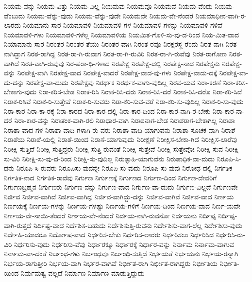 {ನಿಯಮ-ವನ್ನು
ನಿಯಮ-ವಿತ್ತು
ನಿಯಮ-ವಿಲ್ಲ
ನಿಯಮವು
ನಿಯಮವೂ
ನಿಯಮವೆ
ನಿಯಮ-ವೆಂದು
ನಿಯಮ-ವೆಂಬುದು
ನಿಯಮ-ವೆನ್ನು-ವುದು
ನಿಯಮ-ವೆನ್ನು-ವುದೇ
ನಿಯಮವೇ
ನಿಯಮ-ವೇ-ನೆಂದರೆ
ನಿಯಮಾಧೀನ-ವಾಗಿ-ರ-ಲಾರದು
ನಿಯಮಾನು-ಸಾರ
ನಿಯಮಾವಳಿ
ನಿಯಮಾವಳಿ-ಗಳ
ನಿಯಮಾವಳಿ-ಗಳನ್ನು
ನಿಯಮಾವಳಿ-ಗಳಿವೆ
ನಿಯಮಾವಳಿ-ಗಳು
ನಿಯಮಾವಳಿ-ಗಳೆಲ್ಲ
ನಿಯಮಾವಳಿಯ
ನಿಯಮಿತ-ಗೊಳಿ-ಸು-ವು-ದ-ರಿಂದ
ನಿಯ-ಮಿತ-ವಾದ
ನಿಯಾಮಾನು-ಸಾರ
ನಿರಂತರ
ನಿರಂತರ-ತೆಯು
ನಿರಂತರ-ವಾಗಿ
ನಿರಂತ-ರವೂ
ನಿರಕ್ಷರಸ್ಥ-ರೆಂದು
ನಿರತ-ನಾಗಿ
ನಿರತ-ನಾಗಿದ್ದಾಗ
ನಿರತ-ರಾಗಿದ್ದ
ನಿರತ-ರಾ-ಗಿ-ರುವಾಗ
ನಿರತ-ರಾ-ಗಿ-ರುವಿರಿ
ನಿರತ-ರಾ-ಗಿ-ರುವೆವು
ನಿರತ-ರಾಗೋಣ
ನಿರತ-ವಾಗಿದೆ
ನಿರತ-ವಾಗಿ-ರುವುವು
ನಿರ-ಪರಾ-ಧಿ-ಗಳಾದ
ನಿರಪೇಕ್ಷ
ನಿರಪೇಕ್ಷ-ದಲ್ಲಿ
ನಿರಪೇಕ್ಷ-ನಾದ
ನಿರಪೇಕ್ಷನು
ನಿರಪೇಕ್ಷ-ವನ್ನು
ನಿರಪೇಕ್ಷ-ವಾಗಿ
ನಿರಪೇಕ್ಷ-ವಾದ
ನಿರಪೇಕ್ಷ-ವಾದರೆ
ನಿರಪೇಕ್ಷ-ವಾದ-ವು-ಗಳು
ನಿರಪೇಕ್ಷ-ವಾದು-ದಕ್ಕೆ
ನಿರಪೇಕ್ಷ-ವಾ-ದು-ದನ್ನು
ನಿರಪೇಕ್ಷ-ವಾ-ದುದು
ನಿರಪೇಕ್ಷವು
ನಿರರ್ಥಕ
ನಿರರ್ಥಕ-ವಾಗು-ವುದಿಲ್ಲ
ನಿರವ-ಯವ
ನಿರಾ-ಕರಣೆ
ನಿರಾ-ಕರಿಸ-ಬೇಕಾಗು-ವುದು
ನಿರಾ-ಕರಿಸ-ಬೇಡ
ನಿರಾಕ-ರಿಸಿ
ನಿರಾಕ-ರಿಸಿ-ದರು
ನಿರಾಕ-ರಿಸಿ-ದರೆ
ನಿರಾಕ-ರಿಸಿ-ದರೊ
ನಿರಾ-ಕರಿ-ಸಿದೆ
ನಿರಾಕ-ರಿಸಿವೆ
ನಿರಾಕ-ರಿ-ಸುತ್ತೇವೆ
ನಿರಾಕ-ರಿ-ಸುವರು
ನಿರಾ-ಕರಿ-ಸುವ-ವರೆ
ನಿರಾ-ಕರಿ-ಸು-ವುದಿಲ್ಲ
ನಿರಾಕ-ರಿ-ಸು-ವುದು
ನಿರಾ-ಕಾರ
ನಿರಾ-ಕಾ-ರಕ್ಕೆ
ನಿರಾ-ಕಾರದ
ನಿರಾ-ಕಾರ-ದಲ್ಲಿ
ನಿರಾ-ಕಾರ-ದಿಂದ
ನಿರಾ-ಕಾರ-ನಾಗಿ-ರ-ಬೇಕು
ನಿರಾ-ಕಾರ-ನಾ-ದರೆ
ನಿರಾ-ಕಾರ-ವನ್ನು
ನಿರಾತಂಕ-ವಾಗಿ-ರಲಿ
ನಿರಾಧಾರ-ವಾಗಿ
ನಿರಾಶನಾಗ-ಬೇಡ
ನಿರಾಶರಾಗ-ಬೇಕಾಗಿಲ್ಲ
ನಿರಾಶಾ
ನಿರಾಶಾ-ವಾದ-ಗಳ
ನಿರಾಶಾ-ವಾದಿ-ಗಳಾಗಿ-ರು-ವರು
ನಿರಾಶಾ-ವಾದಿ-ಯಾಗುವನು
ನಿರಾಶಾ-ಸೂಚಕ-ವಾಗಿ
ನಿರಾಶೆ
ನಿರಾಶೆಯ
ನಿರಾಶೆ-ಯಲ್ಲಿ
ನಿರಾಶೆ-ಯಿಂದ
ನಿರಾಸೆ-ಯಾಗುವುದು
ನಿರೀಕ್ಷಣೆ
ನಿರೀಕ್ಷಿಸ-ಬೇಕಾ-ಗಿದೆ
ನಿರೀಕ್ಷಿಸ-ಲಾರೆವು
ನಿರೀಕ್ಷಿ-ಸುತ್ತಿದೆ
ನಿರೀಕ್ಷಿ-ಸುತ್ತಿದ್ದರು
ನಿರೀಕ್ಷಿ-ಸುತ್ತಿ-ರುವಂತೆ
ನಿರೀಕ್ಷಿ-ಸುತ್ತೇವೆ
ನಿರೀಕ್ಷಿ-ಸುತ್ತೇವೋ
ನಿರೀಕ್ಷಿ-ಸುವ
ನಿರೀಕ್ಷಿ-ಸು-ವಿರಿ
ನಿರೀಕ್ಷಿ-ಸು-ವು-ದ-ರಿಂದ
ನಿರೀಕ್ಷಿ-ಸು-ವುದಿಲ್ಲ
ನಿರುತ್ಸಾಹಿ-ಯಾಗುವೆನು
ನಿರುಪಾಧಿಕ-ವಾ-ದುದು
ನಿರೂಪಿ-ಸಿ-ದನು
ನಿರೂಪಿ-ಸಿ-ರುವರು
ನಿರೂಪಿಸು-ವುದನ್ನೇ
ನಿರೂಪಿ-ಸು-ವುದು
ನಿರೂಪಿ-ಸು-ವುವು
ನಿರೋಧ-ದಲ್ಲಿ
ನಿರ್ಗತಿಕ
ನಿರ್ಗತಿಕ-ನಾದ
ನಿರ್ಗತಿಕ-ರಾದೆವು
ನಿರ್ಗುಣ
ನಿರ್ಗುಣಕ್ಕೆ
ನಿರ್ಗುಣದ
ನಿರ್ಗುಣ-ದಿಂದ
ನಿರ್ಗುಣ-ದೇವರಿಗೆ
ನಿರ್ಗುಣಬ್ರಹ್ಮನ
ನಿರ್ಗುಣರು
ನಿರ್ಗುಣ-ವನ್ನು
ನಿರ್ಗುಣ-ವಾದ
ನಿರ್ಗುಣ-ವಾ-ದುದು
ನಿರ್ಗುಣ-ವಿಲ್ಲದೆ
ನಿರ್ಗುಣವೇ
ನಿರ್ಜಿವ
ನಿರ್ಜಿವ-ವಾಗಿದೆ
ನಿರ್ಜಿವ-ವಾಗಿದ್ದ
ನಿರ್ಜಿವ-ವಾಗಿದ್ದು-ದನ್ನು
ನಿರ್ಜಿವ-ವಾಗಿವೆ
ನಿರ್ಜಿವ-ವಾದ
ನಿರ್ಣಯ
ನಿರ್ಣಯಕ್ಕೆ
ನಿರ್ಣಯ-ಗಳನ್ನು
ನಿರ್ಣಯ-ಗಳಷ್ಟು
ನಿರ್ಣಯ-ಗಳಿಗೆ
ನಿರ್ಣಯ-ದಿಂದ
ನಿರ್ಣಯ-ವಾದ
ನಿರ್ಣ-ಯವೇ
ನಿರ್ಣಯ-ವೇ-ನಾಯಿ-ತೆಂದರೆ
ನಿರ್ಣಯ-ವೇ-ನೆಂದರೆ
ನಿರ್ದಯ-ನಾಗಿ-ರುವನೋ
ನಿರ್ದಯನು
ನಿರ್ದಿಷ್ಟ
ನಿರ್ದಿಷ್ಟ-ವಾಗಿ-ರುತ್ತದೆ
ನಿರ್ದಿಷ್ಟ-ವಾದ
ನಿರ್ದೆಶಿಸ-ಬಹುದು
ನಿರ್ದೆಶಿಸುತ್ತಿ-ರುವನು
ನಿರ್ದೇಶಿಸು-ವಾಗ-ಲೆಲ್ಲ
ನಿರ್ದೇಶಿಸು-ವುದು
ನಿರ್ದೇಹಿ-ಯಾದರೂ
ನಿರ್ದೋಷ-ವಾದ
ನಿರ್ಧರಿಸ-ಬೇಕು
ನಿರ್ಧರಿಸ-ಲಾರರು
ನಿರ್ಧರಿಸಲು
ನಿರ್ಧರಿಸಿದ
ನಿರ್ಧರಿಸಿ-ರು-ವಿರಿ
ನಿರ್ಧರಿಸು-ವುದು
ನಿರ್ಧರಿಸು-ವೆವು
ನಿರ್ಧಾರಕ್ಕೂ
ನಿರ್ಧಾರಕ್ಕೆ
ನಿರ್ಧಾರ-ವನ್ನು
ನಿರ್ನಾಮ
ನಿರ್ನಾಮ-ವಾಗುವ
ನಿರ್ನಾಮ-ವಾ-ದಂತೆ
ನಿರ್ಬಂಧ-ಗಳು
ನಿರ್ಬಂಧವೂ
ನಿರ್ಬಂಧಿ-ಸುತ್ತಿದೆ
ನಿರ್ಭಯತೆ
ನಿರ್ಭಯನು
ನಿರ್ಭಯ-ರನ್ನಾಗಿ
ನಿರ್ಭಯ-ರಾಗುತ್ತೀರಿ
ನಿರ್ಭಯ-ವಾಗಿ
ನಿರ್ಭರ-ವಾಗಿವೆ
ನಿರ್ಭೀತ-ರಾಗಿ
ನಿರ್ಭೀತ-ರಾಗಿದ್ದರು
ನಿರ್ಭೀತಿಯ
ನಿರ್ಭೀತಿ-ಯಿಂದ
ನಿರ್ಮಮತ್ವ-ವಲ್ಲದೆ
ನಿರ್ಮಾಣ
ನಿರ್ಮಾಣ-ಮಾಡುತ್ತಿದ್ದುದು
}
